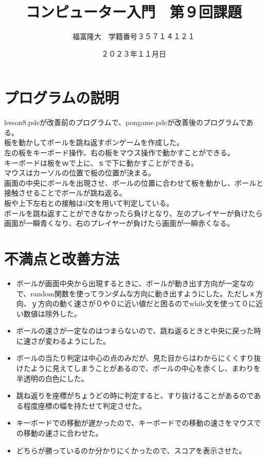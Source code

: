 \documentclass{jsarticle}
\title{コンピューター入門　第９回課題}
\author{福富隆大　学籍番号３５７１４１２１}
\date{２０２３年１１月日}
\begin{document}
\maketitle
\section{プログラムの説明}
lesson8.pdeが改善前のプログラムで、pongame.pdeが改善後のプログラムである。\\
板を動かしてボールを跳ね返すポンゲームを作成した。\\
左の板をキーボード操作、右の板をマウス操作で動かすことができる。\\
キーボードは板をｗで上に、ｓで下に動かすことができる。\\
マウスはカーソルの位置で板の位置が決まる。\\
画面の中央にボールを出現させ、ボールの位置に合わせて板を動かし、ボールと接触させることでボールが跳ね返る。\\
板や上下左右との接触はif文を用いて判定している。\\
ボールを跳ね返すことができなかったら負けとなり、左のプレイヤーが負けたら画面が一瞬青くなり、右のプレイヤーが負けたら画面が一瞬赤くなる。\\
\section{不満点と改善方法}
\begin{itemize}
  \item ボールが画面中央から出現するときに、ボールが動き出す方向が一定なので、random関数を使ってランダムな方向に動き出すようにした。ただしｘ方向、ｙ方向の動く速さが０や０に近い値だと困るのでwhile文を使って０に近い数値は除外した。\\
  \item ボールの速さが一定なのはつまらないので、跳ね返るときと中央に戻った時に速さが変わるようにした。\\
  \item ボールの当たり判定は中心の点のみだが、見た目からはわからにくくすり抜けたように見えてしまうことがあるので、ボールの中心を赤くし、まわりを半透明の白色にした。\\
  \item 跳ね返りを座標がちょうどの時に判定すると、すり抜けることがあるのである程度座標の幅を持たせて判定させた。
  \item キーボードでの移動が遅かったので、キーボードでの移動の速さをマウスでの移動の速さに合わせた。\\
  \item どちらが勝っているのか分かりにくかったので、スコアを表示させた。\\
\end{itemize}
\end{document}
